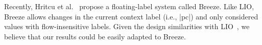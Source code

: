 


Recently, Hritcu et al.~\citep{Breeze} propose a floating-label
system called Breeze. Like LIO, Breeze allows changes in the current
context label (i.e., |pc|) and only considered values with
flow-insensitive labels. Given the design similarities with
LIO~\citep{stefan:lio}, we believe that our results could be easily
adapted to Breeze.

